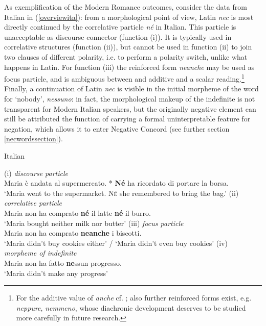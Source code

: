 \documentclass[output=paper,modfonts,nonflat,citecolor=brown,
showindex
]{langsci/langscibook}
\begin{document}
\noindent As exemplification of the Modern Romance outcomes, consider the data from Italian in (\ref{overviewita}): from a morphological point of view, Latin {\emph{nec}} is most directly continued by the correlative particle {\emph{n\'e}} in Italian. This particle is unacceptable as discourse connector (function (i)). It is typically used in correlative structures (function (ii)), but cannot be used in function (ii) to join two clauses of different polarity, i.e. to perform a polarity switch, unlike what happens in Latin. For function (iii) the reinforced form {\emph{neanche}} may be used as focus particle, and is ambiguous between and additive and a scalar reading.{\footnote{For the additive value of {\emph{anche}} cf. \citet[]{Francoetal16b}; also further reinforced forms exist, e.g. {\emph{neppure}}, {\emph{nemmeno}}, whose diachronic development deserves to be studied more carefully in future research.}} Finally, a continuation of Latin {\emph{nec}} is visible in the initial morpheme of the word for `nobody', {\emph{nessuno}}: in fact, the morphological makeup of the indefinite is not transparent for Modern Italian speakers, but the originally negative element can still be attributed the function of carrying a formal uninterpretable feature for negation, which allows it to enter Negative Concord (see further section \ref{necwordssection}). 

{\begin{exe}
\ex \label{overviewita} Italian
\begin{xlist}
\ex \label{polswitchfirstex} (i) {\emph{discourse particle}}\\
Maria \`e andata al supermercato. * {\textbf{N\'e}} ha ricordato di portare la borsa.\\
`Maria went to the supermarket. {\textsc{N\'e}} she remembered to bring the bag.'
\ex (ii) {\emph{correlative particle}}\\
Maria non ha comprato {\textbf{n\'e}} il latte {\textbf{n\'e}} il burro.\\
`Maria bought neither milk nor butter'
\ex (iii) {\emph{focus particle}}\\
Maria non ha comprato {\textbf{neanche}} i biscotti.\\ 
`Maria didn't buy cookies either' / `Maria didn't even buy cookies'
\ex (iv) {\emph{morpheme of indefinite}}\\
Maria non ha fatto {\textbf{ne}}ssun progresso.\\
`Maria didn't make any progress'
\end{xlist}
\end{exe}}
\end{document}
